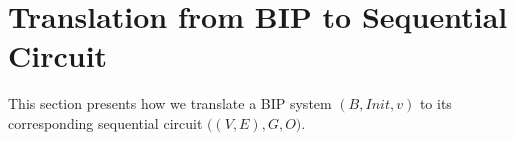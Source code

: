 \section{Translation from BIP to Sequential Circuit}
\label{sect-translation}
This section presents how we translate a BIP system $(B,\mathit{Init}, v)$ to its corresponding sequential circuit  $\big( (V, E),G, O\big)$. 


